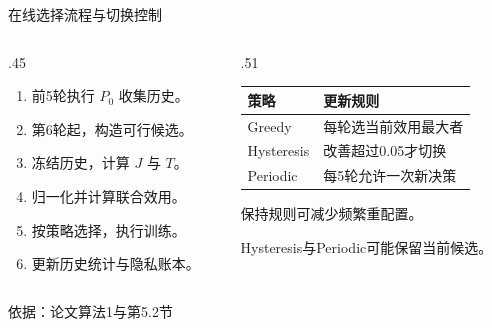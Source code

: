 \documentclass[aspectratio=169,11pt]{beamer}
\newcommand{\src}[1]{\vfill{\color{Gray}\fontsize{7.5}{9}\selectfont 依据：#1\par}}
\newcommand{\tight}{\setlength{\itemsep}{.18cm}}
\begin{document}
\begin{frame}{在线选择流程与切换控制}
\begin{columns}[T,onlytextwidth]
\begin{column}{.45\textwidth}
\begin{enumerate}\tight
\item 前5轮执行 $P_0$ 收集历史。
\item 第6轮起，构造可行候选。
\item 冻结历史，计算 $J$ 与 $T$。
\item 归一化并计算联合效用。
\item 按策略选择，执行训练。
\item 更新历史统计与隐私账本。
\end{enumerate}
\end{column}
\begin{column}{.51\textwidth}
\renewcommand{\arraystretch}{1.55}
\begin{tabular}{@{}p{2.5cm}p{4.0cm}@{}}
\toprule
\textbf{策略} & \textbf{更新规则}\\
\midrule
Greedy & 每轮选当前效用最大者\\
Hysteresis & 改善超过0.05才切换\\
Periodic & 每5轮允许一次新决策\\
\bottomrule
\end{tabular}\par
\par\vspace{.3cm}
保持规则可减少频繁重配置。\par
Hysteresis与Periodic可能保留当前候选。
\end{column}
\end{columns}
\src{论文算法1与第5.2节}
\end{frame}
\end{document}
